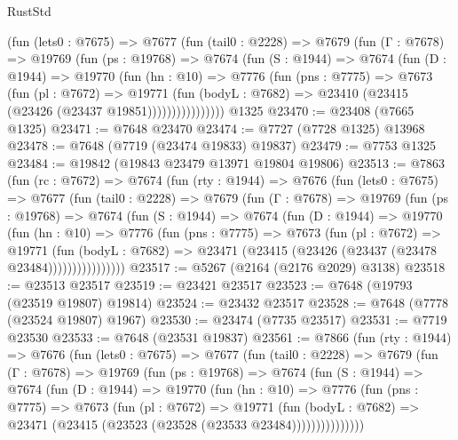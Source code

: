 \begin{lexlean}{RustStd}
\begin{coremodule}
          (fun (lets0 : @7675) =>
          @7677
            (fun (tail0 : @2228) =>
            @7679
              (fun (Γ : @7678) =>
              @19769
                (fun (ps : @19768) =>
                @7674
                  (fun (S : @1944) =>
                  @7674
                    (fun (D : @1944) =>
                    @19770
                      (fun (hn : @10) =>
                      @7776
                        (fun (pns : @7775) =>
                        @7673
                          (fun (pl : @7672) =>
                          @19771
                            (fun (bodyL : @7682) =>
                            @23410 (@23415 (@23426 (@23437 @19851))))))))))))))))
    @1325
@23470 := @23408 (@7665 @1325)
@23471 := @7648 @23470
@23474 := @7727 (@7728 @1325) @13968
@23478 := @7648 (@7719 (@23474 @19833) @19837)
@23479 := @7753 @1325
@23484 := @19842 (@19843 @23479 @13971 @19804 @19806)
@23513 := @7863
    (fun (rc : @7672) =>
    @7674
      (fun (rty : @1944) =>
      @7676
        (fun (lets0 : @7675) =>
        @7677
          (fun (tail0 : @2228) =>
          @7679
            (fun (Γ : @7678) =>
            @19769
              (fun (ps : @19768) =>
              @7674
                (fun (S : @1944) =>
                @7674
                  (fun (D : @1944) =>
                  @19770
                    (fun (hn : @10) =>
                    @7776
                      (fun (pns : @7775) =>
                      @7673
                        (fun (pl : @7672) =>
                        @19771
                          (fun (bodyL : @7682) =>
                          @23471 (@23415 (@23426 (@23437 (@23478 @23484))))))))))))))))
@23517 := @5267 (@2164 (@2176 @2029) @3138)
@23518 := @23513 @23517
@23519 := @23421 @23517
@23523 := @7648 (@19793 (@23519 @19807) @19814)
@23524 := @23432 @23517
@23528 := @7648 (@7778 (@23524 @19807) @1967)
@23530 := @23474 (@7735 @23517)
@23531 := @7719 @23530
@23533 := @7648 (@23531 @19837)
@23561 := @7866
    (fun (rty : @1944) =>
    @7676
      (fun (lets0 : @7675) =>
      @7677
        (fun (tail0 : @2228) =>
        @7679
          (fun (Γ : @7678) =>
          @19769
            (fun (ps : @19768) =>
            @7674
              (fun (S : @1944) =>
              @7674
                (fun (D : @1944) =>
                @19770
                  (fun (hn : @10) =>
                  @7776
                    (fun (pns : @7775) =>
                    @7673
                      (fun (pl : @7672) =>
                      @19771
                        (fun (bodyL : @7682) =>
                        @23471 (@23415 (@23523 (@23528 (@23533 @23484)))))))))))))))

\end{coremodule}
\end{lexlean}
